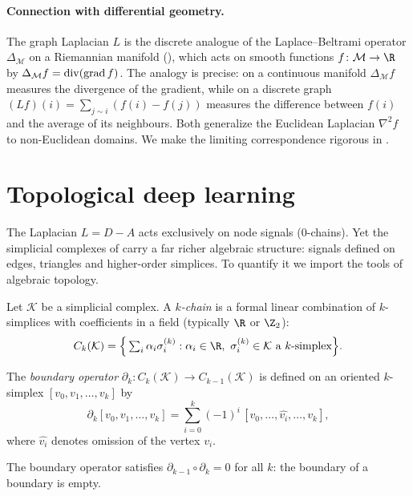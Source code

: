 \paragraph{Connection with differential geometry.}
The graph Laplacian $L$ is the discrete analogue of the Laplace--Beltrami
operator $\Delta_{\mathcal{M}}$ on a Riemannian manifold (),
which acts on smooth functions $f \colon \mathcal{M} \to \R$ by
$\Delta_{\mathcal{M}} f = \operatorname{div}(\operatorname{grad} f)$. The analogy is precise: on a continuous
manifold $\Delta_{\mathcal{M}} f$ measures the divergence of the gradient, while
on a discrete graph $(L f)(i) = \sum_{j \sim i} (f(i) - f(j))$ measures the
difference between $f(i)$ and the average of its neighbours. Both generalize the
Euclidean Laplacian $\nabla^2 f$ to non-Euclidean domains. We make the limiting
correspondence rigorous in .

\section{Topological deep learning}
\label{sec:graphs:tdl}

The Laplacian $L = D - A$ acts exclusively on node signals ($0$-chains). Yet the
simplicial complexes of  carry a far richer algebraic
structure: signals defined on edges, triangles and higher-order simplices. To
quantify it we import the tools of algebraic topology.

\begin{definition}[Chains]
\label{def:graphs:chains}
Let $\mathcal{K}$ be a simplicial complex. A \emph{$k$-chain} is a formal linear
combination of $k$-simplices with coefficients in a field (typically $\R$ or
$\Z_2$):
\[
  C_k(\mathcal{K}) = \Big\{ \textstyle\sum_i \alpha_i \sigma_i^{(k)}
    : \alpha_i \in \R,\ \sigma_i^{(k)} \in \mathcal{K} \text{ a $k$-simplex} \Big\}.
\]
\end{definition}

\begin{definition}
\label{def:graphs:boundary}
The \emph{boundary operator}
$\partial_k \colon C_k(\mathcal{K}) \to C_{k-1}(\mathcal{K})$ is defined on an
oriented $k$-simplex $[v_0, v_1, \dots, v_k]$ by
\[
  \partial_k [v_0, v_1, \dots, v_k]
    = \sum_{i=0}^{k} (-1)^i\, [v_0, \dots, \widehat{v_i}, \dots, v_k],
\]
where $\widehat{v_i}$ denotes omission of the vertex $v_i$.
\end{definition}

\begin{proposition}
\label{prop:graphs:boundary-squared}
The boundary operator satisfies $\partial_{k-1} \circ \partial_k = 0$ for all
$k$: the boundary of a boundary is empty.
\end{proposition}

